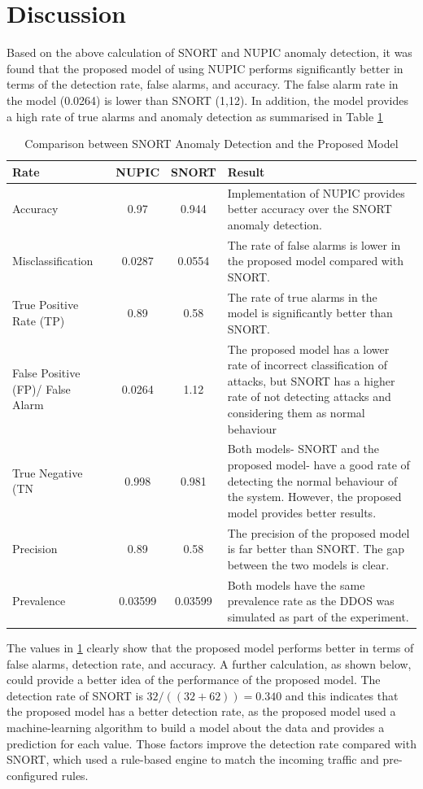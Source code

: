 \documentclass[sigconf]{acmart}
\begin{document}
\section{Discussion}
\label{sec:res} 
Based on the above calculation of SNORT and NUPIC anomaly detection, it was found that the proposed model of using NUPIC performs significantly better in terms of the detection rate, false alarms, and accuracy. The false alarm rate in the model (0.0264) is lower than SNORT (1,12). In addition, the model provides a high rate of true alarms and anomaly detection as summarised in Table \ref{Table_3}   
\begin{table}[h!]
\centering
\footnotesize
\caption{Comparison between SNORT Anomaly Detection and the Proposed Model}
\label{Table_3}
\begin{tabular}{|p{1.5cm}|c|c|p{3.8cm}|}
 \hline 
 Rate & NUPIC & SNORT & Result \\ 
 \hline 
 Accuracy  & 0.97 & 0.944 & Implementation of NUPIC provides better accuracy over the SNORT anomaly detection. \\ 
 \hline 
 Misclassification  & 0.0287 & 0.0554 & The rate of false alarms is lower in the proposed model compared with SNORT. \\ 
 \hline 
 True Positive Rate (TP)  & 0.89 & 0.58 & The rate of true alarms in the model is significantly better than SNORT. \\ 
 \hline 
 False Positive (FP)/ False Alarm & 0.0264 & 1.12 & The proposed model has a lower rate of incorrect classification of attacks, but SNORT has a higher rate of not detecting attacks and considering them as normal behaviour \\ 
 \hline 
 True Negative (TN & 0.998 & 0.981 & Both models- SNORT and the proposed model- have a good rate of detecting the normal behaviour of the system. However, the proposed model provides better results.  \\ 
 \hline 
 Precision  & 0.89 & 0.58 & The precision of the proposed model is far better than SNORT. The gap between the two models is clear. \\ 
 \hline 
 Prevalence  & 0.03599 & 0.03599 & Both models have the same prevalence rate as the DDOS was simulated as part of the experiment. \\ 
 \hline 
 
 \end{tabular} 
\end{table}
 The values in \ref{Table_3} clearly show that the proposed model performs better in terms of false alarms, detection rate, and accuracy. A further calculation, as shown below, could provide a better idea of the performance of the proposed model. The detection rate of SNORT is $32/((32+62) )=0.340$ and this indicates that the proposed model has a better detection rate, as the proposed model used a machine-learning algorithm to build a model about the data and provides a prediction for each value. Those factors improve the detection rate compared with SNORT, which used a rule-based engine to match the incoming traffic and pre-configured rules. 
\end{document}
